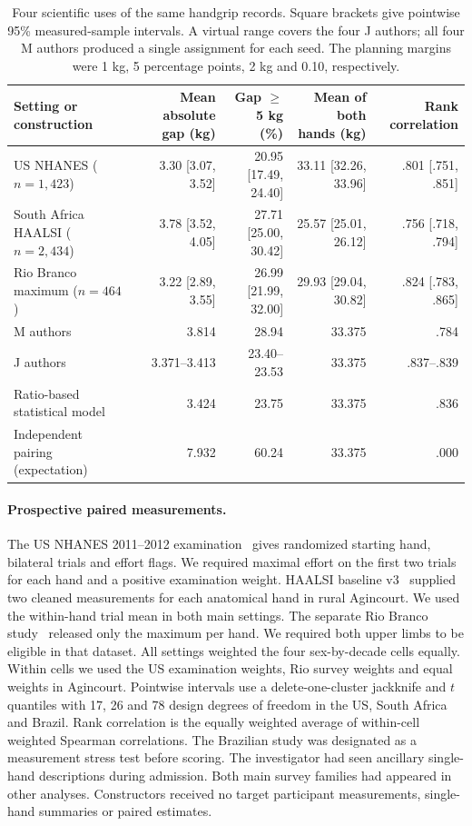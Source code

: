 \begin{table}[t]
\caption{Four scientific uses of the same handgrip records. Square brackets give pointwise 95\% measured-sample intervals. A virtual range covers the four J authors; all four M authors produced a single assignment for each seed. The planning margins were 1 kg, 5 percentage points, 2 kg and 0.10, respectively.}
\label{tab:grip}
\centering\small
\begin{tabular}{lrrrr}\toprule
Setting or construction & Mean absolute gap (kg) & Gap $\geq$5 kg (\%) & Mean of both hands (kg) & Rank correlation\\\midrule
US NHANES ($n=1{,}423$) & 3.30 [3.07, 3.52] & 20.95 [17.49, 24.40] & 33.11 [32.26, 33.96] & .801 [.751, .851]\\
South Africa HAALSI ($n=2{,}434$) & 3.78 [3.52, 4.05] & 27.71 [25.00, 30.42] & 25.57 [25.01, 26.12] & .756 [.718, .794]\\
Rio Branco maximum ($n=464$) & 3.22 [2.89, 3.55] & 26.99 [21.99, 32.00] & 29.93 [29.04, 30.82] & .824 [.783, .865]\\\midrule
M authors & 3.814 & 28.94 & 33.375 & .784\\
J authors & 3.371--3.413 & 23.40--23.53 & 33.375 & .837--.839\\
Ratio-based statistical model & 3.424 & 23.75 & 33.375 & .836\\
Independent pairing (expectation) & 7.932 & 60.24 & 33.375 & .000\\\bottomrule
\end{tabular}
\end{table}

\paragraph{Prospective paired measurements.}
The US NHANES 2011--2012 examination~\cite{grip_cdc} gives randomized starting hand, bilateral trials and effort flags. We required maximal effort on the first two trials for each hand and a positive examination weight. HAALSI baseline v3~\cite{grip_haalsi} supplied two cleaned measurements for each anatomical hand in rural Agincourt. We used the within-hand trial mean in both main settings. The separate Rio Branco study~\cite{grip_rio} released only the maximum per hand. We required both upper limbs to be eligible in that dataset. All settings weighted the four sex-by-decade cells equally. Within cells we used the US examination weights, Rio survey weights and equal weights in Agincourt. Pointwise intervals use a delete-one-cluster jackknife and $t$ quantiles with 17, 26 and 78 design degrees of freedom in the US, South Africa and Brazil. Rank correlation is the equally weighted average of within-cell weighted Spearman correlations. The Brazilian study was designated as a measurement stress test before scoring. The investigator had seen ancillary single-hand descriptions during admission. Both main survey families had appeared in other analyses. Constructors received no target participant measurements, single-hand summaries or paired estimates.

